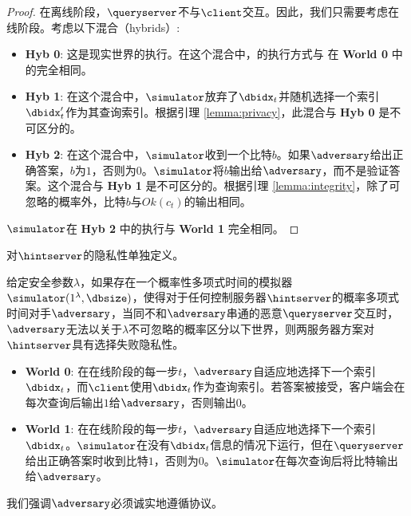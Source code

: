 \begin{proof}
    
    在离线阶段，$\queryserver$不与$\client$交互。因此，我们只需要考虑在线阶段。考虑以下混合（hybrids）:
    
    \begin{itemize}
        \item \textbf{Hyb 0}: 这是现实世界的执行。在这个混合中，\simulator 的执行方式与 \client 在 \textbf{World 0} 中的完全相同。
        \item \textbf{Hyb 1}: 在这个混合中，$\simulator$放弃了$\dbidx_t$并随机选择一个索引$\dbidx_t'$作为其查询索引。根据引理 \ref{lemma:privacy}，此混合与 \textbf{Hyb 0} 是不可区分的。
        \item \textbf{Hyb 2}: 在这个混合中，$\simulator$收到一个比特$b$。如果$\adversary$给出正确答案，$b$为$1$，否则为$0$。$\simulator$将$b$输出给$\adversary$，而不是验证答案。这个混合与 \textbf{Hyb 1} 是不可区分的。根据引理 \ref{lemma:integrity}，除了可忽略的概率外，比特$b$与$Ok(c_t)$的输出相同。
    \end{itemize}
    $\simulator$在 \textbf{Hyb 2} 中的执行与 \textbf{World 1} 完全相同。
\end{proof}
    
对$\hintserver$的隐私性单独定义。
    
\begin{definition}
    给定安全参数$\lambda$，如果存在一个概率性多项式时间的模拟器$\simulator(1^\lambda, \dbsize)$，使得对于任何控制服务器$\hintserver$的概率多项式时间对手$\adversary$，当同不和$\adversary$串通的恶意$\queryserver$交互时，$\adversary$无法以关于$\lambda$不可忽略的概率区分以下世界，则两服务器方案对$\hintserver$具有选择失败隐私性。
    
    \begin{itemize}
        \item \textbf{World 0}: 在在线阶段的每一步$t$，$\adversary$自适应地选择下一个索引$\dbidx_t$，而$\client$使用$\dbidx_t$作为查询索引。若答案被接受，客户端会在每次查询后输出$1$给$\adversary$，否则输出$0$。
        \item \textbf{World 1}: 在在线阶段的每一步$t$，$\adversary$自适应地选择下一个索引$\dbidx_t$。$\simulator$在没有$\dbidx_t$信息的情况下运行，但在$\queryserver$给出正确答案时收到比特$1$，否则为$0$。$\simulator$在每次查询后将比特输出给$\adversary$。
    \end{itemize}
    
    我们强调$\adversary$必须诚实地遵循协议。
\end{definition}
    
